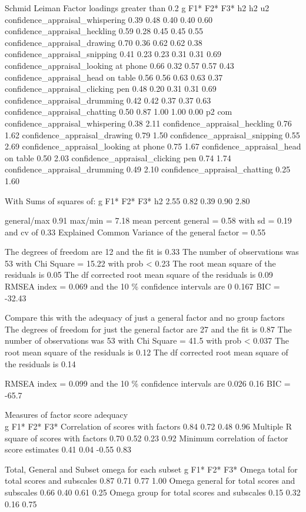 \documentclass[
]{article}
\begin{document}
Schmid Leiman Factor loadings greater than 0.2 g F1* F2* F3* h2 h2 u2
confidence\_appraisal\_whispering 0.39 0.48 0.40 0.40 0.60
confidence\_appraisal\_heckling 0.59 0.28 0.45 0.45 0.55
confidence\_appraisal\_drawing 0.70 0.36 0.62 0.62 0.38
confidence\_appraisal\_snipping 0.41 0.23 0.23 0.31 0.31 0.69
confidence\_appraisal\_looking at phone 0.66 0.32 0.57 0.57 0.43
confidence\_appraisal\_head on table 0.56 0.56 0.63 0.63 0.37
confidence\_appraisal\_clicking pen 0.48 0.20 0.31 0.31 0.69
confidence\_appraisal\_drumming 0.42 0.42 0.37 0.37 0.63
confidence\_appraisal\_chatting 0.50 0.87 1.00 1.00 0.00 p2 com
confidence\_appraisal\_whispering 0.38 2.11
confidence\_appraisal\_heckling 0.76 1.62 confidence\_appraisal\_drawing
0.79 1.50 confidence\_appraisal\_snipping 0.55 2.69
confidence\_appraisal\_looking at phone 0.75 1.67
confidence\_appraisal\_head on table 0.50 2.03
confidence\_appraisal\_clicking pen 0.74 1.74
confidence\_appraisal\_drumming 0.49 2.10
confidence\_appraisal\_chatting 0.25 1.60

With Sums of squares of: g F1* F2* F3* h2 2.55 0.82 0.39 0.90 2.80

general/max 0.91 max/min = 7.18 mean percent general = 0.58 with sd =
0.19 and cv of 0.33 Explained Common Variance of the general factor =
0.55

The degrees of freedom are 12 and the fit is 0.33 The number of
observations was 53 with Chi Square = 15.22 with prob \textless{} 0.23
The root mean square of the residuals is 0.05 The df corrected root mean
square of the residuals is 0.09 RMSEA index = 0.069 and the 10 \%
confidence intervals are 0 0.167 BIC = -32.43

Compare this with the adequacy of just a general factor and no group
factors The degrees of freedom for just the general factor are 27 and
the fit is 0.87 The number of observations was 53 with Chi Square = 41.5
with prob \textless{} 0.037 The root mean square of the residuals is
0.12 The df corrected root mean square of the residuals is 0.14

RMSEA index = 0.099 and the 10 \% confidence intervals are 0.026 0.16
BIC = -65.7

Measures of factor score adequacy\\
g F1* F2* F3* Correlation of scores with factors 0.84 0.72 0.48 0.96
Multiple R square of scores with factors 0.70 0.52 0.23 0.92 Minimum
correlation of factor score estimates 0.41 0.04 -0.55 0.83

Total, General and Subset omega for each subset g F1* F2* F3* Omega
total for total scores and subscales 0.87 0.71 0.77 1.00 Omega general
for total scores and subscales 0.66 0.40 0.61 0.25 Omega group for total
scores and subscales 0.15 0.32 0.16 0.75
\end{document}
